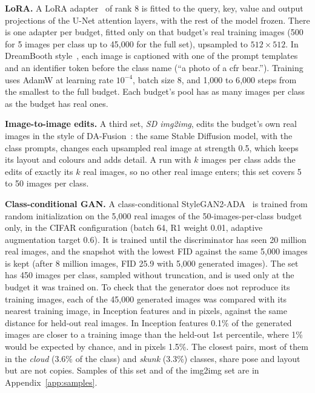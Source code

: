 \textbf{LoRA.} A LoRA adapter~\cite{hu2022lora} of rank 8 is fitted to the query, key, value and output
projections of the U-Net attention layers, with the rest of the model frozen. There is one adapter per budget,
fitted only on that budget's real training images (500 for 5 images per class up to 45{,}000 for the full set),
upsampled to $512\times512$. In DreamBooth style~\cite{ruiz2023dreambooth}, each image is captioned with one of
the prompt templates and an identifier token before the class name (``a photo of a cfr bear.''). Training uses
AdamW at learning rate $10^{-4}$, batch size 8, and 1{,}000 to 6{,}000 steps from the smallest to the full budget.
Each budget's pool has as many images per class as the budget has real ones.

\textbf{Image-to-image edits.} A third set, \textit{SD img2img}, edits the budget's own real images in the style of DA-Fusion~\cite{trabucco2024effective}: the same Stable Diffusion model, with the class prompts, changes each upsampled real image at strength 0.5, which keeps its layout and colours and adds detail. A run with $k$ images per class adds the edits of exactly its $k$ real images, so no other real image enters; this set covers 5 to 50 images per class.

\textbf{Class-conditional GAN.} A class-conditional StyleGAN2-ADA~\cite{karras2020training} is trained from random initialization on the 5,000 real images of the 50-images-per-class budget only, in the CIFAR configuration (batch 64, R1 weight 0.01, adaptive augmentation target 0.6). It is trained until the discriminator has seen 20 million real images, and the snapshot with the lowest FID against the same 5,000 images is kept (after 8 million images, FID 25.9 with 5,000 generated images). The set has 450 images per class, sampled without truncation, and is used only at the budget it was trained on.
To check that the generator does not reproduce its training images, each of the 45{,}000 generated images was
compared with its nearest training image, in Inception features and in pixels, against the same distance for
held-out real images. In Inception features 0.1\% of the generated images are closer to a training image than
the held-out 1st percentile, where 1\% would be expected by chance, and in pixels 1.5\%. The closest pairs, most
of them in the \textit{cloud} (3.6\% of the class) and \textit{skunk} (3.3\%) classes, share pose and layout
but are not copies. Samples of this set and of the img2img set are in Appendix~\ref{app:samples}.

